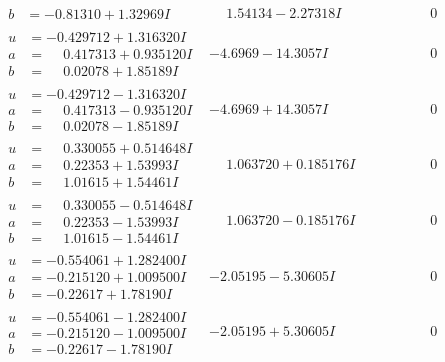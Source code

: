 \documentclass[1p]{elsarticle_modified}
\theoremstyle{definition}
\begin{document}
$$\begin{array}{c|c|c}
\begin{aligned}
b &= -0.81310 + 1.32969 I\end{aligned}
 & \phantom{-}1.54134 - 2.27318 I & \phantom{-0.000000 } 0 \\ \hline\begin{aligned}
u &= -0.429712 + 1.316320 I \\
a &= \phantom{-}0.417313 + 0.935120 I \\
b &= \phantom{-}0.02078 + 1.85189 I\end{aligned}
 & -4.6969 - 14.3057 I & \phantom{-0.000000 } 0 \\ \hline\begin{aligned}
u &= -0.429712 - 1.316320 I \\
a &= \phantom{-}0.417313 - 0.935120 I \\
b &= \phantom{-}0.02078 - 1.85189 I\end{aligned}
 & -4.6969 + 14.3057 I & \phantom{-0.000000 } 0 \\ \hline\begin{aligned}
u &= \phantom{-}0.330055 + 0.514648 I \\
a &= \phantom{-}0.22353 + 1.53993 I \\
b &= \phantom{-}1.01615 + 1.54461 I\end{aligned}
 & \phantom{-}1.063720 + 0.185176 I & \phantom{-0.000000 } 0 \\ \hline\begin{aligned}
u &= \phantom{-}0.330055 - 0.514648 I \\
a &= \phantom{-}0.22353 - 1.53993 I \\
b &= \phantom{-}1.01615 - 1.54461 I\end{aligned}
 & \phantom{-}1.063720 - 0.185176 I & \phantom{-0.000000 } 0 \\ \hline\begin{aligned}
u &= -0.554061 + 1.282400 I \\
a &= -0.215120 + 1.009500 I \\
b &= -0.22617 + 1.78190 I\end{aligned}
 & -2.05195 - 5.30605 I & \phantom{-0.000000 } 0 \\ \hline\begin{aligned}
u &= -0.554061 - 1.282400 I \\
a &= -0.215120 - 1.009500 I \\
b &= -0.22617 - 1.78190 I\end{aligned}
 & -2.05195 + 5.30605 I & \phantom{-0.000000 } 0 \\ \hline\begin{aligned}

\end{aligned}
\end{array}$$
\end{document}

